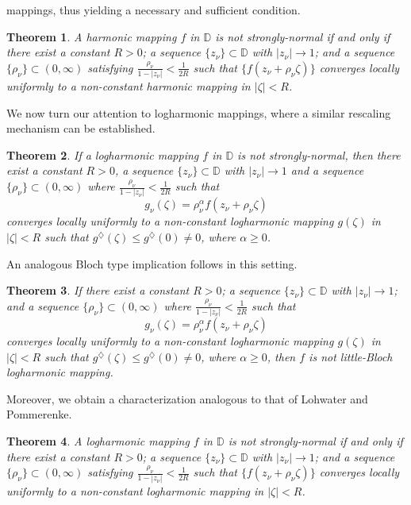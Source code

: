 \documentclass[11pt, reqno]{amsart}
\newtheorem{theorem}{Theorem}[section]
\theoremstyle{definition}
\theoremstyle{remark}
\numberwithin{equation}{section}
\begin{document}
mappings, thus yielding a necessary and sufficient condition.
\begin{theorem} \label{T:LPSNHM}
A harmonic mapping $f$ in $\mathbb{D}$ is not strongly-normal
if and only if there exist a constant $R>0$; a 
sequence $\{z_{\nu}\}\subset \mathbb{D}$ with $|z_{\nu}|\to1$; and a sequence $\{\rho_{\nu} \}\subset(0,\infty)$ satisfying 
$\displaystyle\frac{\rho_{\nu} }{1-|z_{\nu}|}<\frac{1}{2R}$ such that $\{f(z_{\nu}+\rho_{\nu} \zeta)\}$ converges locally uniformly to a non-constant harmonic mapping in $|\zeta|<R$.
\end{theorem}
We now turn our attention to logharmonic mappings, where a similar rescaling mechanism can be established.
\begin{theorem} \label{T:FPZPSNLHMF}
    If a logharmonic mapping $f$ in $\mathbb D$ is not strongly-normal, then there exist a constant $R>0$, a sequence $\{z_{\nu}\}\subset \mathbb D$
    with $|z_{\nu}|\to1$ and a sequence $\{\rho_{\nu} \}\subset (0,\infty)$ where $\displaystyle\frac{\rho_{\nu} }{1-|z_{\nu}|}<\frac{1}{2R}$ such that \begin{equation*}g_{\nu}(\zeta)=\rho_{\nu} ^{\alpha}f(z_{\nu}+\rho_{\nu} \zeta)\end{equation*}
    converges locally uniformly to a non-constant logharmonic mapping $g(\zeta)$ in $|\zeta|<R$ 
    such that $g^\diamondsuit(\zeta)\le g^\diamondsuit(0)\neq0$, where $\alpha\geq 0$.
\end{theorem}
An analogous Bloch type implication follows in this setting.
\begin{theorem} \label{T:CPZPSNLHMF}
    If there exist a constant $R>0$; a sequence $\{z_{\nu}\}\subset \mathbb D$ with 
    $|z_{\nu}|\to1$; and a sequence $\{\rho_{\nu} \}\subset (0,\infty)$ where 
    $\displaystyle\frac{\rho_{\nu} }{1-|z_{\nu}|}<\frac{1}{2R}$ such that \begin{equation*}g_{\nu}(\zeta)=\rho_{\nu} ^{\alpha}f(z_{\nu}+\rho_{\nu} \zeta)\end{equation*}
    converges locally uniformly to a non-constant logharmonic mapping $g(\zeta)$ in $|\zeta|<R$ 
    such that $g^\diamondsuit(\zeta)\le g^\diamondsuit(0)\neq0$, where $\alpha\geq 0$, then $f$ is not little-Bloch logharmonic mapping.
\end{theorem}
Moreover, we obtain a characterization analogous to that of Lohwater and Pommerenke.
\begin{theorem} \label{T:LPSNLHM}
A logharmonic mapping $f$ in $\mathbb{D}$ is not strongly-normal
if and only if there exist a constant $R>0$; a sequence $\{z_{\nu}\}\subset \mathbb{D}$ with 
$|z_{\nu}|\to1$; and a sequence $\{\rho_{\nu} \}\subset(0,\infty)$ satisfying 
$\displaystyle\frac{\rho_{\nu} }{1-|z_{\nu}|}<\frac{1}{2R}$ such that $\{f(z_{\nu}+\rho_{\nu} \zeta)\}$ 
converges locally uniformly to a non-constant logharmonic mapping in $|\zeta|<R$.
\end{theorem}
\end{document}
